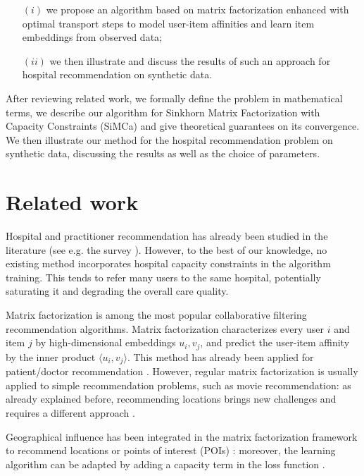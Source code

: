 \begin{itemize}
    \item[$(i)$] we propose an algorithm based on matrix factorization enhanced with optimal transport steps to model user-item affinities and learn item embeddings from observed data;
    \item[$(ii)$] we then illustrate and discuss the results of such an approach for hospital recommendation on synthetic data.
\end{itemize}

After reviewing related work, we formally define the problem in mathematical terms, we describe our algorithm for Sinkhorn Matrix Factorization with Capacity Constraints (SiMCa) and give theoretical guarantees on its convergence. We then illustrate our method for the hospital recommendation problem on synthetic data, discussing the results as well as the choice of parameters.

\section{Related work}
Hospital and practitioner recommendation has already been studied in the literature (see e.g. the survey \cite{tran_recommender_2021}). However, to the best of our knowledge, no existing method incorporates hospital capacity constraints in the algorithm training. This tends to refer many users to the same hospital, potentially saturating it and degrading the overall care quality.

Matrix factorization \cite{koren_matrix_2009} is among the most popular collaborative filtering recommendation algorithms. Matrix factorization characterizes every user $i$ and item $j$ by high-dimensional embeddings $u_i, v_j$, and predict the user-item affinity by the inner product $\langle u_i, v_j \rangle$. This method has already been applied for patient/doctor recommendation \cite{zhang_idoctor_2017, han_hybrid_2018}. However, regular matrix factorization is usually applied to simple recommendation problems, such as movie recommendation: as already explained before, recommending locations brings new challenges and requires a different approach \cite{zhao_survey_2016}.

Geographical influence has been integrated in the matrix factorization framework to recommend locations or points of interest (POIs) \cite{li_rank-geofm_2015}: moreover, the learning algorithm can be adapted by adding a capacity term in the loss function \cite{christakopoulou_recommendation_2017}.

